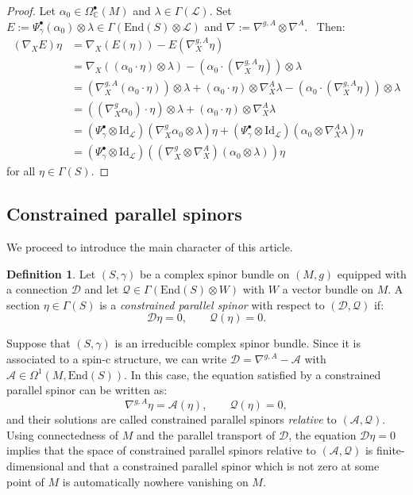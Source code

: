 \documentclass[10pt,a4paper,twoside,reqno]{amsart}
\theoremstyle{plain}
\theoremstyle{definition}
\newtheorem{definition}[thm]{Definition}
\theoremstyle{remark}
\newcommand{\End}{\mathrm{End}}
\def\C{\mathbb{C}}
\def\cQ{\mathcal{Q}}
\def\Id{\mathrm{Id}}
\def\cD{\mathcal{D}}
\def\cA{\mathcal{A}}
\def\cL{\mathcal{L}}
\begin{document}
\begin{proof}
Let $\alpha_0\in\Omega^{\bullet}_\C(M)$ and $\lambda\in\Gamma(\cL)$. Set $E := \Psi^{\bullet}_\gamma(\alpha_0)\otimes\lambda\in\Gamma(\End(S)\otimes\cL)$ and $\nabla:=\nabla^{g,A}\otimes\nabla^{A}$. ~Then: \begin{align*}
        (\nabla_XE)\eta&=\nabla_X(E(\eta))-E(\nabla^{g,A}_X\eta)\\
        &=\nabla_X((\alpha_0\cdot\eta)\otimes\lambda)-(\alpha_0\cdot(\nabla^{g,A}_X\eta))\otimes\lambda\\
        &=(\nabla^{g,A}_X(\alpha_0\cdot\eta))\otimes\lambda+(\alpha_0\cdot\eta)\otimes\nabla^{A}_X\lambda-(\alpha_0\cdot(\nabla^{g,A}_X\eta))\otimes\lambda\\
        &=((\nabla^g_X\alpha_0)\cdot\eta)\otimes\lambda+(\alpha_0\cdot\eta)\otimes\nabla^{A}_X\lambda\\
        &=(\Psi^{\bullet}_\gamma\otimes\Id_{\cL})(\nabla^g_X\alpha_0\otimes\lambda)\eta+(\Psi^{\bullet}_\gamma\otimes\Id_{\cL})(\alpha_0\otimes\nabla^{A}_X\lambda)\eta\\
        &=(\Psi^{\bullet}_\gamma\otimes\Id_{\cL})((\nabla^g_X\otimes\nabla^{A}_X)(\alpha_0\otimes\lambda))\eta
    \end{align*} for all $\eta\in\Gamma(S)$.
\end{proof}


\subsection{Constrained parallel spinors}


We proceed to introduce the main character of this article.

\begin{definition}
Let $(S,\gamma)$ be a complex spinor bundle on $(M,g)$ equipped with a connection $\cD$ and let $\cQ\in\Gamma(\End(S)\otimes W)$ with $W$ a vector bundle on $M$. A section $\eta\in\Gamma(S)$ is a \emph{constrained parallel spinor} with respect to $(\cD,\cQ)$ if: $$\cD\eta=0,\qquad\cQ(\eta)=0.$$
\end{definition}

Suppose that $(S,\gamma)$ is an irreducible complex spinor bundle. Since it is associated to a spin-c structure, we can write $\cD=\nabla^{g,A}-\cA$ with $\cA\in\Omega^1(M,\End(S))$. In this case, the equation satisfied by a constrained parallel spinor can be written as: $$\nabla^{g,A}\eta=\cA(\eta),\qquad\cQ(\eta)=0,$$ and their solutions are called constrained parallel spinors \emph{relative} to $(\cA,\cQ)$. Using connectedness of $M$ and the parallel transport of $\cD$, the equation $\cD\eta=0$ implies that the space of constrained parallel spinors relative to $(\cA,\cQ)$ is finite-dimensional and that a constrained parallel spinor which is not zero at some point of $M$ is automatically nowhere vanishing on $M$.
\end{document}
